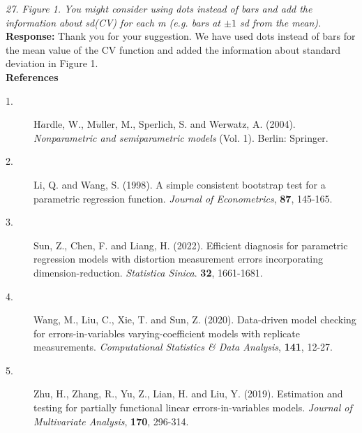 \documentclass[12pt]{report}
\begin{document}
\begin{description}
\item { { \textcolor[rgb]{0.00,0.50,1.00}{\em 27.  Figure 1. You might consider using dots instead of bars and add the information about
sd(CV) for each m (e.g. bars at $\pm 1$ sd from the mean).}}} \\

{ \bf Response: }  Thank you for your suggestion. We have used dots instead of bars for the mean value of the CV function and added the information about standard deviation  in Figure 1.\\


\textbf{References}\\


\begin{description}

\item [1.]  H$\ddot{a}$rdle, W., M$\ddot{u}$ller, M., Sperlich, S. and Werwatz, A. (2004). {\it Nonparametric and semiparametric models} (Vol. 1). Berlin: Springer.

\item [2.]  Li, Q. and Wang, S. (1998). A simple consistent bootstrap test for a parametric regression function.
{\it Journal of Econometrics}, {\bf 87}, 145-165.

\item [3.] Sun, Z., Chen, F. and  Liang, H. (2022). Efficient diagnosis for parametric regression models with distortion measurement errors
   incorporating dimension-reduction. {\it Statistica Sinica}. {\bf 32}, 1661-1681.

\item [4.] Wang, M., Liu, C., Xie, T. and Sun, Z. (2020). Data-driven model checking for errors-in-variables varying-coefficient models with replicate measurements. {\it Computational Statistics \& Data Analysis}, {\bf 141}, 12-27.


\item [5.] Zhu, H., Zhang, R., Yu, Z., Lian, H. and Liu, Y. (2019). Estimation and testing for partially functional linear
  errors-in-variables models. {\it Journal of Multivariate Analysis}, {\bf 170}, 296-314.
\end{description}


\end{description}
\end{document}
